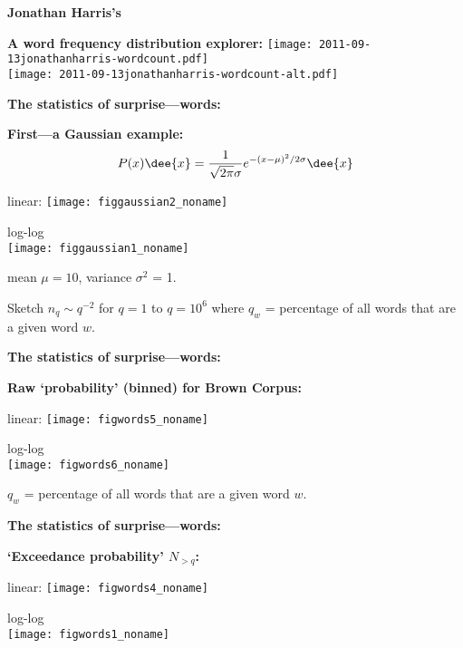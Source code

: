   \textbf{Jonathan Harris's }

  \textbf{A word frequency distribution explorer:}
  \texttt{[image: 2011-09-13jonathanharris-wordcount.pdf]}\\
  \smallskip
  \texttt{[image: 2011-09-13jonathanharris-wordcount-alt.pdf]}
  
  



  \textbf{The statistics of surprise---words:}

  \textbf{First---a Gaussian example:}
    $$
    P(x) \dee{x} = 
    \frac{1}{\sqrt{2\pi} \sigma}
    e^{-(x-\mu)^2/2\sigma} 
    \dee{x}
    $$
          
      
      linear:
      \texttt{[image: figgaussian2\_noname]}
      
      log-log\\
      \texttt{[image: figgaussian1\_noname]}
      
        mean $\mu=10$, variance $\sigma^2$ = 1.
  

  
    
    
      Sketch $n_q \sim q^{-2}$ for $q=1$ to $q=10^6$ 
      where  $q_w$ = percentage of all words that are a given word $w$.
    
  



  \textbf{The statistics of surprise---words:}

  \textbf{Raw `probability' (binned) for Brown Corpus:}
          
      
      linear:
      \texttt{[image: figwords5\_noname]} %
      
              
          
        log-log\\
        \texttt{[image: figwords6\_noname]} %
            
        $q_{w}$ = percentage of all words that are a given word $w$.



  \textbf{The statistics of surprise---words:}

  \textbf{`Exceedance probability' $N_{> q}$:}
          
      
      linear:
      \texttt{[image: figwords4\_noname]}
      
      log-log\\
      \texttt{[image: figwords1\_noname]}
      
